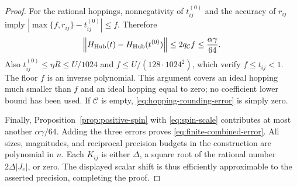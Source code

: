 \begin{proof}
For the rational hoppings, nonnegativity of $t^{(0)}_{ij}$ and the
accuracy of $r_{ij}$ imply
$|\max\{f,r_{ij}\}-t^{(0)}_{ij}|\leq f$.
Therefore
\begin{equation}\label{eq:hopping-rounding-error}
 \left\|H_{\rm Hub}(t)-H_{\rm Hub}(t^{(0)})\right\|
      \leq2q_{\mathcal C}f\leq\frac{\alpha\gamma}{64}.
\end{equation}
Also $t^{(0)}_{ij}\leq\eta\overline R\leq U/1024$ and
$f\leq U/(128\cdot1024^2)$, which verify $f\leq t_{ij}<1$.
The floor $f$ is an inverse polynomial.  This argument covers an ideal
hopping much smaller than $f$ and an ideal hopping equal to zero; no
coefficient lower bound has been used.  If $\mathcal C$ is empty,
\eqref{eq:hopping-rounding-error} is simply zero.

Finally, Proposition~\ref{prop:positive-spin} with
\eqref{eq:spin-scale} contributes at most another
$\alpha\gamma/64$.  Adding the three errors proves
\eqref{eq:finite-combined-error}.  All sizes, magnitudes, and reciprocal
precision budgets in the construction are polynomial in $n$.
Each $K_{ij}$ is either $\Delta$, a square root of the rational number
$2\Delta|J_e|$, or zero.  The displayed scalar shift is thus efficiently
approximable to the asserted precision, completing the proof.
\end{proof}
